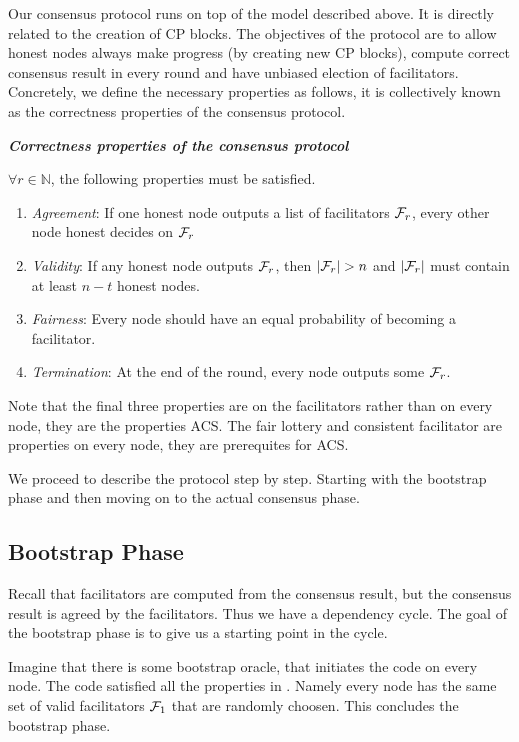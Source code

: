 Our consensus protocol runs on top of the model described above.
It is directly related to the creation of CP blocks.
The objectives of the protocol are to
    allow honest nodes always make progress (by creating new CP blocks),
    compute correct consensus result in every round
    and have unbiased election of facilitators.
Concretely, we define the necessary properties as follows,
it is collectively known as the correctness properties of the consensus protocol.
\begin{definition}
\label{def:consensus}
\textbf{\emph{Correctness properties of the consensus protocol}}

$\forall r \in \mathbb{N}$, the following properties must be satisfied.
\begin{enumerate}
    \item \emph{Agreement}:
        If one honest node outputs a list of facilitators $\mathcal{F}_r$,
        every other node honest decides on $\mathcal{F}_r$
    \item \emph{Validity}:
        If any honest node outputs $\mathcal{F}_r$, then $|\mathcal{F}_r| > n$ and $|\mathcal{F}_r|$ must contain at least $n - t$ honest nodes.
    \item \emph{Fairness}:
        Every node should have an equal probability of becoming a facilitator.
    \item \emph{Termination}:
        At the end of the round, every node outputs some $\mathcal{F}_r$.
\end{enumerate}

\end{definition}
Note that the final three properties are on the facilitators rather than on every node,
they are the properties ACS. 
The fair lottery and consistent facilitator are properties on every node,
they are prerequites for ACS.

We proceed to describe the protocol step by step.
Starting with the bootstrap phase and then moving on to the actual consensus phase.

\subsection{Bootstrap Phase}
\label{sec:bootstrap}
Recall that facilitators are computed from the consensus result,
but the consensus result is agreed by the facilitators.
Thus we have a dependency cycle.
The goal of the bootstrap phase is to give us a starting point in the cycle.

Imagine that there is some bootstrap oracle, that initiates the code on every node.
The code satisfied all the properties in .
Namely every node has the same set of valid facilitators $\mathcal{F}_1$ that are randomly choosen.
This concludes the bootstrap phase.

